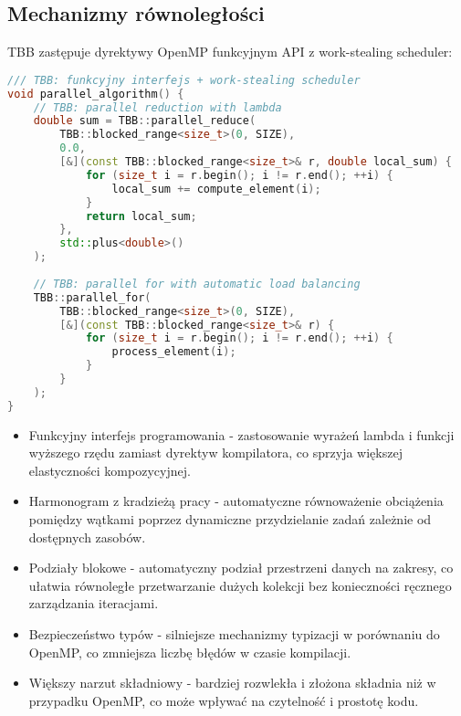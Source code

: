 \subsection{Mechanizmy równoległości}
TBB zastępuje dyrektywy OpenMP funkcyjnym API z work-stealing scheduler:
\begin{lstlisting}[language=C++, style=VS2017,  caption={Implementacja TBB - równoległość}, label={lst:TBB-parallelism}]
/// TBB: funkcyjny interfejs + work-stealing scheduler
void parallel_algorithm() {
    // TBB: parallel reduction with lambda
    double sum = TBB::parallel_reduce(
        TBB::blocked_range<size_t>(0, SIZE),
        0.0,
        [&](const TBB::blocked_range<size_t>& r, double local_sum) {
            for (size_t i = r.begin(); i != r.end(); ++i) {
                local_sum += compute_element(i);
            }
            return local_sum;
        },
        std::plus<double>()
    );
    
    // TBB: parallel for with automatic load balancing
    TBB::parallel_for(
        TBB::blocked_range<size_t>(0, SIZE),
        [&](const TBB::blocked_range<size_t>& r) {
            for (size_t i = r.begin(); i != r.end(); ++i) {
                process_element(i);
            }
        }
    );
}
\end{lstlisting}
\begin{itemize}
    \item Funkcyjny interfejs programowania - zastosowanie wyrażeń lambda i funkcji wyższego rzędu zamiast dyrektyw kompilatora, co sprzyja większej elastyczności kompozycyjnej.
    
    \item Harmonogram z kradzieżą pracy  - automatyczne równoważenie obciążenia pomiędzy wątkami poprzez dynamiczne przydzielanie zadań zależnie od dostępnych zasobów.
    
    \item Podziały blokowe - automatyczny podział przestrzeni danych na zakresy, co ułatwia równoległe przetwarzanie dużych kolekcji bez konieczności ręcznego zarządzania iteracjami.
    
    \item Bezpieczeństwo typów - silniejsze mechanizmy typizacji w porównaniu do OpenMP, co zmniejsza liczbę błędów w czasie kompilacji.
    
    \item Większy narzut składniowy - bardziej rozwlekła i złożona składnia niż w przypadku OpenMP, co może wpływać na czytelność i prostotę kodu.
\end{itemize}

